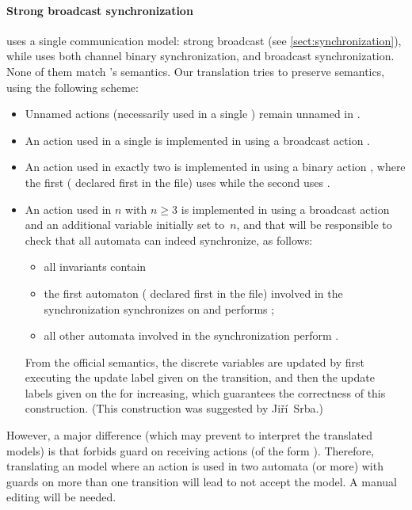 \paragraph{Strong broadcast synchronization}
\imitator{} uses a single communication model: strong broadcast (see \cref{sect:synchronization}), while \uppaal{} uses both channel binary synchronization, and broadcast synchronization.
None of them match \imitator{}'s semantics.
Our translation tries to preserve \imitator{} semantics, using the following scheme:
\begin{itemize}
	\item Unnamed actions (necessarily used in a single \IPTA{}) remain unnamed in \uppaal{}.
	\item An action  used in a single \IPTA{} is implemented in \uppaal{} using a broadcast action .
	\item An action  used in exactly two \IPTA{} is implemented in \uppaal{} using a binary action , where the first (\ie{} declared first in the \imitator{} file) uses  while the second uses .
	\item An action  used in $n$ \IPTA{} with $n \geq 3$ is implemented in \uppaal{} using a broadcast action  and an additional variable  initially set to~$n$, and that will be responsible to check that all automata can indeed synchronize, as follows:
	      \begin{itemize}
		      \item all invariants contain 
		      \item the first automaton (\ie{} declared first in the \imitator{} file) involved in the synchronization synchronizes on  and performs ;
		      \item all other automata involved in the synchronization perform .
	      \end{itemize}
	      From the \uppaal{} official semantics, the discrete variables are updated by first executing the update label given on the  transition, and then the update labels given on the  for increasing, which guarantees the correctness of this construction.
	      (This construction was suggested by Jiří~Srba.)
\end{itemize}
However, a major difference (which may prevent \uppaal{} to interpret the translated models) is that \uppaal{} forbids guard on receiving actions (of the form ).
Therefore, translating an \imitator{} model where an action  is used in two automata (or more) with guards on more than one transition will lead \uppaal{} to not accept the model.
A manual editing will be needed.

